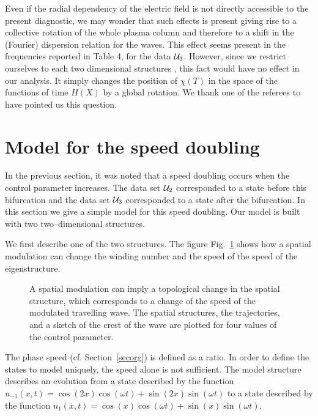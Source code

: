 \begin{rem}
Even if the radial dependency of the electric field is not 
directly accessible to the present diagnostic, we may wonder 
that such effects is present giving rise to a collective rotation 
of the whole plasma column and therefore to a shift in the (Fourier)
dispersion relation for the waves.
This effect seems present in the frequencies reported in Table 4,
for the data ${\cal U}_3$. However, since we restrict ourselves
to each two dimensional structures , this fact would have no effect
in our analysis. It simply changes the position of $\chi(T)$ in 
the space of the functions of time $H(X)$ by a global rotation. We thank
one of the referees to have pointed us this question.
\end{rem}

\section{\label{secmodel}Model for the speed doubling}
In the previous section, it was noted that a speed doubling occurs when
the control parameter increases. 
The data set ${\cal U}_2$ corresponded to a state 
before this bifurcation and the data set ${\cal U}_3$  
corresponded to a state after the bifurcation.
In this section we give a simple model for this speed doubling.
Our model is built with two two--dimensional structures.

\medskip

We first describe one of the two structures.
The figure Fig.~\ref{modelsketch} shows how a spatial modulation
can change the winding number and the speed of the speed of the 
eigenstructure.

\begin{figure}
\centering
{}    
\caption{A spatial modulation can imply a topological change in
the spatial structure, which corresponds to a change
of the speed of the modulated travelling wave. The spatial structures, 
the trajectories, and a sketch of the crest of the wave are plotted for
four values of the control parameter.} 
\label{modelsketch}   
\end{figure}

The phase speed (cf. Section~\ref{secorg}) is defined as a ratio.
In order to define the states to model uniquely, the speed
alone is not sufficient. 
The model structure describes an evolution from a state described by the
function $u_{-1}(x,t)=\cos(2x)\cos(\omega t)+\sin(2x)\sin(\omega t)$ 
to a state described by the function 
$u_{1}(x,t)=\cos(x)\cos(\omega t)+\sin(x)\sin(\omega t)$.

